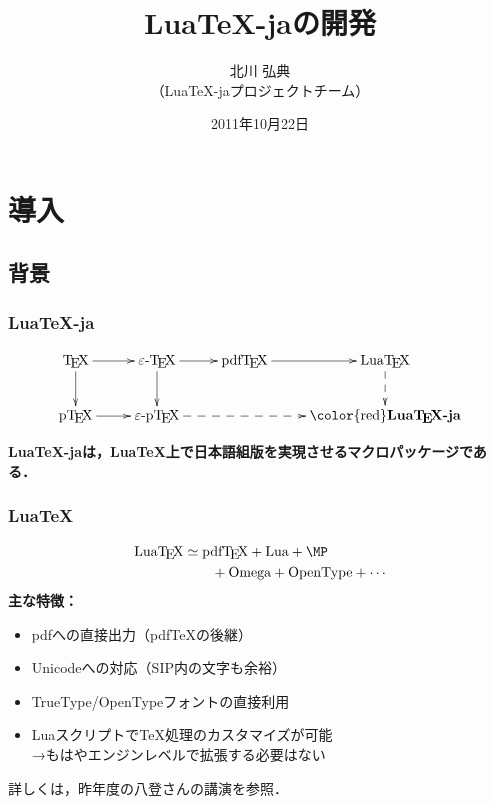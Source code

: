 \documentclass[notheorems,12pt,hyperref={unicode=true}]{beamer}
\title{Lua\TeX-jaの開発}
\author[北川 弘典]{北川 弘典\\\footnotesize（Lua\TeX-jaプロジェクトチーム）}
\date{2011年10月22日}
\def\alert#1{{\color{red}\bfseries#1}}
\begin{document}
\begin{frame}
  \titlepage
\end{frame}

\section{導入}


\subsection{背景}
\begin{frame}
  \frametitle{Lua\TeX-ja}
  {\large\[
    \xymatrix{
      \text{\TeX}\ar[r]\ar[d]&\text{$\varepsilon$-\TeX}\ar[d]\ar[r]
      &\text{pdf\TeX}\ar[r]&\text{Lua\TeX}\ar@{-->}[d]\\
      \text{p\TeX}\ar[r]&\text{$\varepsilon$-p\TeX}
      \ar@{-->}[rr]&&\text{\alert{Lua\TeX-ja}}
    }
  \]}%
  \begin{center}
    \bfseries\Large 
    Lua\TeX-jaは，Lua\TeX 上で日本語組版を実現させるマクロパッケージである．
  \end{center}
\end{frame}

\begin{frame}[fragile]
  \frametitle{Lua\TeX}
  {\large\begin{align*}
    \text{Lua\TeX}&\simeq \text{pdf\TeX}+ \text{Lua}+\text{\MP}\\
    &\qquad+\text{Omega}+\text{OpenType}+ \cdots
  \end{align*}}
  \textbf{主な特徴：}
  \begin{itemize}
    \item pdfへの直接出力（pdf\TeX の後継）
    \item Unicodeへの対応{\small （SIP内の文字も余裕）}
    \item TrueType/OpenTypeフォントの直接利用
    \item Luaスクリプトで\TeX 処理のカスタマイズが可能\\
      \quad →もはやエンジンレベルで拡張する必要はない
  \end{itemize}

  \footnotesize 詳しくは，昨年度の八登さんの講演を参照．
\end{frame}
\end{document}
